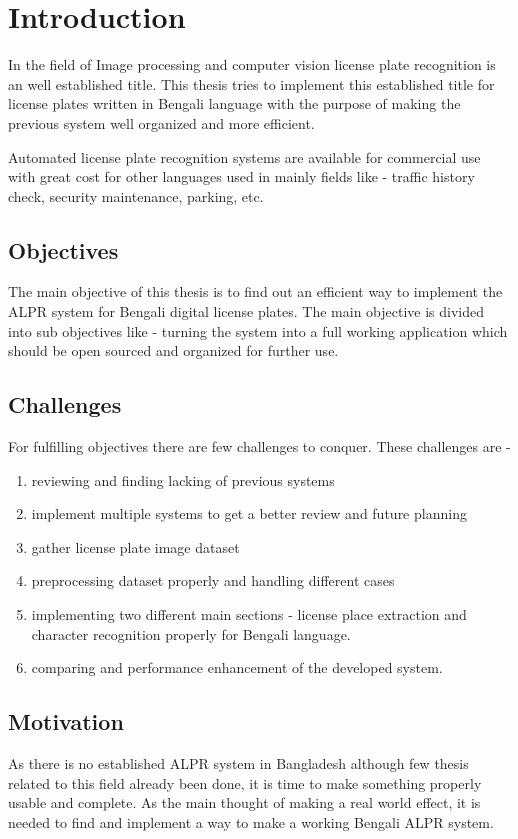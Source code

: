 \documentclass{standalone}
\begin{document}
\chapter{Introduction}
In the field of Image processing and computer vision license plate recognition is an well established title. This thesis tries to implement this established title for license plates written in Bengali language with the purpose of making the previous system well organized and more efficient.  

Automated license plate recognition systems are available for commercial use with great cost for other languages used in mainly fields like - traffic history check, security maintenance, parking, etc. 

\section{Objectives}
The main objective of this thesis is to find out an efficient way to implement the ALPR system for Bengali digital license plates. The main objective is divided into sub objectives like - turning the system into a full working application which should be open sourced and organized for further use. 

\section{Challenges}
For fulfilling objectives there are few challenges to conquer. These challenges are -
	\begin{enumerate}
		\item reviewing and finding lacking of previous systems
		\item implement multiple systems to get a better review and future planning
        \item gather license plate image dataset
        \item preprocessing dataset properly and handling different cases
        \item implementing two different main sections - license place extraction and character recognition properly for Bengali language.
        \item comparing and performance enhancement of the developed system.
	\end{enumerate}
    
\section{Motivation}
As there is no established ALPR system in Bangladesh although few thesis related to this field already been done, it is time to make something properly usable and complete. As the main thought of making a real world effect, it is needed to find and implement a way to make a working Bengali ALPR system.
\end{document}
